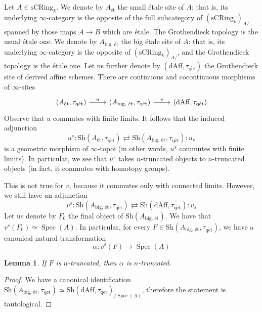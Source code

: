 \documentclass[12pt,a4paper,reqno]{amsart}
\theoremstyle{plain}
\newtheorem{lem}[thm]{Lemma}
\theoremstyle{definition}
\theoremstyle{remark}
\numberwithin{equation}{section}
\begin{document}
Let $A \in \mathrm{sCRing}_k$.
We denote by $A_{\mathrm{\acute{e}t}}$ the small \'etale site of $A$: that is, its underlying $\infty$-category is the opposite of the full subcategory of $(\mathrm{sCRing}_k)_{A/}$ spanned by those maps $A \to B$ which are \'etale. The Grothendieck topology is the usual \'etale one.
We denote by $A_{\text{big, \'et}}$ the big \'etale site of $A$: that is, its underlying $\infty$-category is the opposite of $(\mathrm{sCRing}_k)_{A/}$, and the Grothendieck topology is the \'etale one.
Let us further denote by $(\mathrm{dAff},{\tau_\mathrm{q\acute{e}t}})$ the Grothendieck site of derived affine schemes.
There are continuous and cocontinuous morphisms of $\infty$-sites
\[ \begin{tikzcd}
(A_{\mathrm{\acute{e}t}}, {\tau_\mathrm{q\acute{e}t}}) \arrow{r}{u} & (A_{\text{big, \'et}}, {\tau_\mathrm{q\acute{e}t}}) \arrow{r}{v} & (\mathrm{dAff}, {\tau_\mathrm{q\acute{e}t}})
\end{tikzcd} \]
Observe that $u$ commutes with finite limits.
It follows that the induced adjunction
\[ u^s \colon {\mathrm{Sh}}(A_{\text{\'et}}, {\tau_\mathrm{q\acute{e}t}}) \rightleftarrows {\mathrm{Sh}}(A_{\text{big, \'et}}, {\tau_\mathrm{q\acute{e}t}}) \colon u_s \]
is a geometric morphism of $\infty$-topoi (in other words, $u^s$ commutes with finite limits).
In particular, we see that $u^s$ takes $n$-truncated objects to $n$-truncated objects (in fact, it commutes with homotopy groups).

This is not true for $v$, because it commutes only with connected limits.
However, we still have an adjunction
\[ v^s \colon {\mathrm{Sh}}(A_{\text{big, \'et}}, {\tau_\mathrm{q\acute{e}t}}) \rightleftarrows {\mathrm{Sh}}(\mathrm{dAff}, {\tau_\mathrm{q\acute{e}t}}) \colon v_s \]
Let us denote by $F_0$ the final object of ${\mathrm{Sh}}(A_{\text{big, \'et}})$.
We have that $v^s(F_0) \simeq \operatorname{Spec}(A)$.
In particular, for every $F \in {\mathrm{Sh}}(A_{\text{big, \'et}}, {\tau_\mathrm{q\acute{e}t}})$, we have a canonical natural transformation
\[ \alpha \colon v^s(F) \to \operatorname{Spec}(A) \]

\begin{lem}
	If $F$ is $n$-truncated, then $\alpha$ is $n$-truncated.
\end{lem}

\begin{proof}
	We have a canonical identification ${\mathrm{Sh}}(A_{\text{big, \'et}}, {\tau_\mathrm{q\acute{e}t}}) \simeq {\mathrm{Sh}}(\mathrm{dAff}, {\tau_\mathrm{q\acute{e}t}})_{/\operatorname{Spec}(A)}$, therefore the statement is tautological.
\end{proof}
\end{document}
